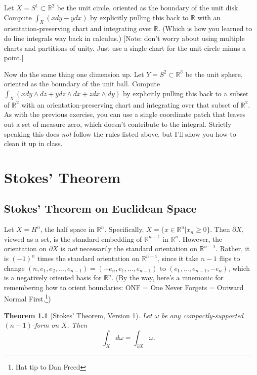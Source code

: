 \documentclass[12pt]{amsbook}
\newcommand{\be}{\begin{equation}}
\newcommand{\ee}{\end{equation}}
\newcommand{\R}{{\mathbb R}}
\newtheorem{thm}{Theorem}[section]
\theoremstyle{definition}
\begin{document}
\smallskip

 Let $X= S^1 \subset \R^2$ be the unit circle,
oriented as the boundary of the unit disk. Compute 
$\int_X (x dy - y dx)$ by explicitly pulling this back to $\R$ with an 
orientation-preserving chart and integrating over $\R$. (Which is how you
learned to do line integrals way back in calculus.) [Note: don't worry
about using multiple charts and partitions of unity. Just use a single chart for
the unit circle minus a point.] 

\smallskip

 Now do the same thing one dimension up. 
Let $Y= S^2 \subset \R^3$ be the unit sphere,
oriented as the boundary of the unit ball. Compute 
$\int_X (x dy \wedge dz + y dz \wedge dx + z dx \wedge dy)$ 
by explicitly pulling this back to a subset of $\R^2$ with an 
orientation-preserving chart and integrating over that subset of $\R^2$. 
As with the previous exercise, you can use a single coordinate patch that 
leaves out a set of measure zero, which doesn't contribute to the integral.
Strictly speaking this does {\em not} follow the rules listed above, 
but I'll show you how to clean it up in class. 

\chapter{Stokes' Theorem}

\section{Stokes' Theorem on Euclidean Space}

Let $X=H^n$, the half space in $\R^n$. Specifically, $X = \{ x \in \R^n | 
x_n \ge 0 \}$. Then $\partial X$, viewed as a set, is the standard 
embedding of $\R^{n-1}$ in $\R^n$. However, the orientation on $\partial X$
is {\em not} necessarily the standard orientation on $\R^{n-1}$. Rather, it 
is $(-1)^n$ times the standard orientation on $\R^{n-1}$, since it take $n-1$
flips to change $(n,e_1,e_2,\ldots,e_{n-1})=(-e_n,e_1,\ldots,e_{n-1})$ to 
$(e_1,\ldots,e_{n-1},-e_n)$, which is a negatively oriented basis for $\R^n$. 
(By the way, here's a mnemonic for remembering how to orient boundaries:
ONF = One Never Forgets = Outward Normal First.\footnote{Hat tip to Dan Freed}) 

\begin{thm}[Stokes' Theorem, Version 1] Let $\omega$ be any 
compactly-supported $(n-1)$-form on $X$. Then 
\be \label{Stokes-1} \int_X d \omega = \int_{\partial X} \omega. \ee
\end{thm}
\end{document}
